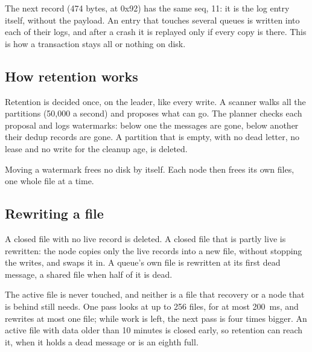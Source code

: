 
The next record (474 bytes, at 0x92) has the same seq, 11: it is the log entry itself, without the
payload. An entry that touches several queues is written into each of their logs, and after a
crash it is replayed only if every copy is there. This is how a transaction stays all or nothing on
disk.


\subsection{How retention works}

Retention is decided once, on the leader, like every write. A scanner walks all the partitions
(50,000 a second) and proposes what can go. The planner checks each proposal and logs watermarks:
below one the messages are gone, below another their dedup records are gone. A partition that is
empty, with no dead letter, no lease and no write for the cleanup age, is deleted.

Moving a watermark frees no disk by itself. Each node then frees its own files, one whole file at a
time.


\subsection{Rewriting a file}

A closed file with no live record is deleted. A closed file that is partly live is rewritten: the
node copies only the live records into a new file, without stopping the writes, and swaps it in.
A queue's own file is rewritten at its first dead message, a shared file when half of it is dead.

The active file is never touched, and neither is a file that recovery or a node that is behind
still needs. One pass looks at up to 256 files, for at most 200~ms, and rewrites at most one file;
while work is left, the next pass is four times bigger. An active file with data older than 10
minutes is closed early, so retention can reach it, when it holds a dead message or is an eighth
full.


